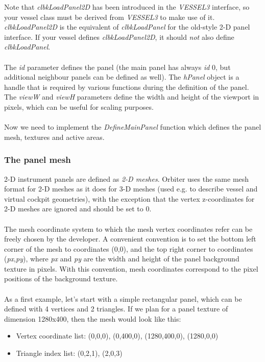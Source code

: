 \documentclass[Orbiter Developer Manual.tex]{subfiles}
\begin{document}
\noindent
Note that \textit{clbkLoadPanel2D} has been introduced in the \textit{VESSEL3} interface, so your vessel class must be derived from \textit{VESSEL3} to make use of it. \textit{clbkLoadPanel2D} is the equivalent of \textit{clbkLoadPanel} for the old-style 2-D panel interface. If your vessel defines \textit{clbkLoadPanel2D}, it should \textit{not} also define \textit{clbkLoadPanel}.\\
\\
The \textit{id} parameter defines the panel (the main panel has always \textit{id} 0, but additional neighbour panels can be defined as well). The \textit{hPanel} object is a handle that is required by various functions during the definition of the panel. The \textit{viewW} and \textit{viewH} parameters define the width and height of the viewport in pixels, which can be useful for scaling purposes.\\
\\
Now we need to implement the \textit{DefineMainPanel} function which defines the panel mesh, textures and active areas.


\subsubsection{The panel mesh}
2-D instrument panels are defined as \textit{2-D meshes}. Orbiter uses the same mesh format for 2-D meshes as it does for 3-D meshes (used e.g. to describe vessel and virtual cockpit geometries), with the exception that the vertex z-coordinates for 2-D meshes are ignored and should be set to 0.\\
\\
The mesh coordinate system to which the mesh vertex coordinates refer can be freely chosen by the developer. A convenient convention is to set the bottom left corner of the mesh to coordinates (0,0), and the top right corner to coordinates (\textit{px},\textit{py}), where \textit{px} and \textit{py} are the width and height of the panel background texture in pixels. With this convention, mesh coordinates correspond to the pixel positions of the background texture.\\
\\
As a first example, let's start with a simple rectangular panel, which can be defined with 4 vertices and 2 triangles. If we plan for a panel texture of dimension 1280x400, then the mesh would look like this:
\begin{itemize}
\item Vertex coordinate list: (0,0,0), (0,400,0), (1280,400,0), (1280,0,0)
\item Triangle index list: (0,2,1), (2,0,3)
\end{itemize}
\end{document}
